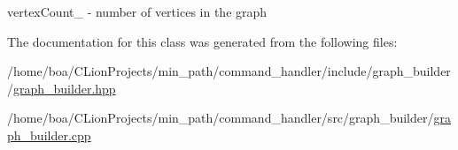 vertex\+Count\+\_\+ -\/ number of vertices in the graph 



The documentation for this class was generated from the following files\+:\begin{DoxyCompactItemize}
\item 
/home/boa/\+C\+Lion\+Projects/min\+\_\+path/command\+\_\+handler/include/graph\+\_\+builder/\hyperlink{a00020}{graph\+\_\+builder.\+hpp}\item 
/home/boa/\+C\+Lion\+Projects/min\+\_\+path/command\+\_\+handler/src/graph\+\_\+builder/\hyperlink{a00026}{graph\+\_\+builder.\+cpp}\end{DoxyCompactItemize}
